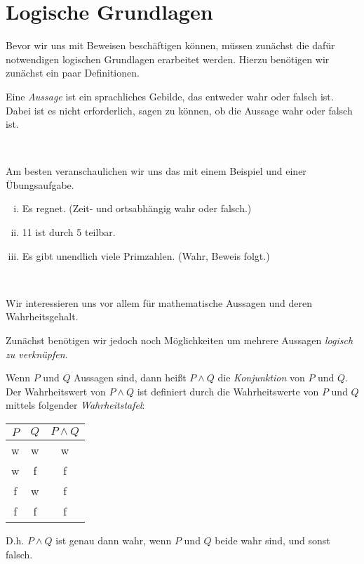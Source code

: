 \chapter{Logische Grundlagen}

Bevor wir uns mit Beweisen beschäftigen können, müssen zunächst die dafür notwendigen logischen
Grundlagen erarbeitet werden. Hierzu benötigen wir zunächst ein paar Definitionen.

\begin{mydef}
    Eine \textit{Aussage} ist ein sprachliches Gebilde, das entweder wahr oder falsch ist.
    Dabei ist es nicht erforderlich, sagen zu können, ob die Aussage wahr oder falsch ist.
\end{mydef}\  

Am besten veranschaulichen wir uns das mit einem Beispiel und einer Übungsaufgabe.

\begin{example}
    \begin{enumerate}[(i)]
        \item
        Es regnet. (Zeit- und ortsabhängig wahr oder falsch.)
        \item
        11 ist durch 5 teilbar.
        \item
        Es gibt unendlich viele Primzahlen. (Wahr, Beweis folgt.)
    \end{enumerate}
\end{example} \ 

Wir interessieren uns vor allem für mathematische Aussagen und deren Wahrheitsgehalt.

Zunächst benötigen wir jedoch noch Möglichkeiten um mehrere Aussagen \textit{ logisch zu verknüpfen}.

\begin{mydef}
    Wenn $P$ und $Q$ Aussagen sind, dann heißt $P \wedge Q$ die \textit{Konjunktion} von $P$ und $Q$.
    Der Wahrheitswert von $P \wedge Q$ ist definiert durch die Wahrheitswerte von $P$ und $Q$ mittels
    folgender \textit{Wahrheitstafel}: \newline
    \begin{tabular}{ c | c | c }
        $P$ & $Q$ & $P \wedge Q$ \\
        \hline
        w & w & w \\
        w & f & f \\
        f & w & f \\
        f & f & f \\
    \end{tabular}
    \newline 
    D.h. $P \wedge Q$ ist genau dann wahr, wenn $P$ und $Q$ beide wahr sind, und sonst falsch.
\end{mydef}\ 

